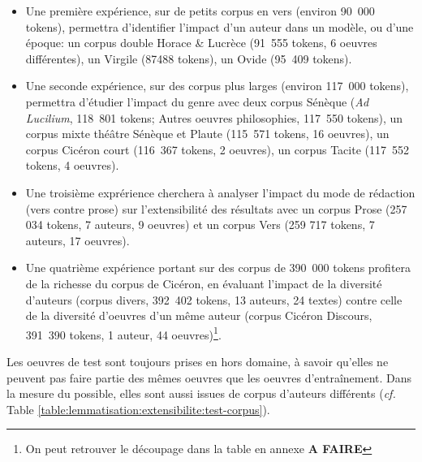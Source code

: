 \begin{itemize}
    \item Une première expérience, sur de petits corpus en vers (environ 90~000 tokens), permettra d'identifier l'impact d'un auteur dans un modèle, ou d'une époque: un corpus double Horace \& Lucrèce (91~555 tokens, 6 oeuvres différentes), un Virgile (87488 tokens), un Ovide (95~409 tokens).
    \item Une seconde expérience, sur des corpus plus larges (environ 117~000 tokens), permettra d'étudier l'impact du genre avec deux corpus Sénèque (\textit{Ad Lucilium}, 118~801 tokens; Autres oeuvres philosophies, 117~550 tokens), un corpus mixte théâtre Sénèque et Plaute (115~571 tokens, 16 oeuvres), un corpus Cicéron court (116~367 tokens, 2 oeuvres), un corpus Tacite (117~552 tokens, 4 oeuvres).
    \item Une troisième exprérience cherchera à analyser l'impact du mode de rédaction (vers contre prose) sur l'extensibilité des résultats avec un corpus Prose (257 034 tokens, 7 auteurs, 9 oeuvres) et un corpus Vers (259 717 tokens, 7 auteurs, 17 oeuvres).
    \item Une quatrième expérience portant sur des corpus de 390~000 tokens profitera de la richesse du corpus de Cicéron, en évaluant l'impact de la diversité d'auteurs (corpus divers, 392~402 tokens, 13 auteurs, 24 textes) contre celle de la diversité d'oeuvres d'un même auteur (corpus Cicéron Discours, 391~390 tokens, 1 auteur, 44 oeuvres)\footnote{On peut retrouver le découpage dans la table en annexe \textbf{A FAIRE}}.
\end{itemize}{}

Les oeuvres de test sont toujours prises en hors domaine, à savoir qu'elles ne peuvent pas faire partie des mêmes oeuvres que les oeuvres d'entraînement. Dans la mesure du possible, elles sont aussi issues de corpus d'auteurs différents (\textit{cf.} Table \ref{table:lemmatisation:extensibilite:test-corpus}).

